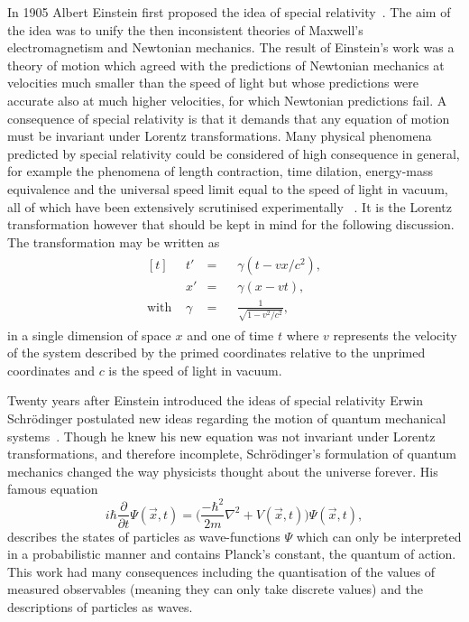 In 1905 Albert Einstein first proposed the idea of special
relativity~\cite{Einstein:special}. The aim of the idea was to unify the then
inconsistent theories of Maxwell's electromagnetism and Newtonian mechanics. The
result of Einstein's work was a theory of motion which agreed with the
predictions of Newtonian mechanics at velocities much smaller than the speed of
light but whose predictions were accurate also at much higher velocities, for
which Newtonian predictions fail. A consequence of special relativity is that
it demands that any equation of motion must be invariant under Lorentz
transformations. Many physical phenomena predicted by special relativity could be
considered of high consequence in general, for example the phenomena of length
contraction, time dilation, energy-mass equivalence and the universal speed
limit equal to the speed of light in vacuum, all of which have been extensively
scrutinised experimentally ~\cite{sr-tests-1, sr-tests-2, sr-tests-3,
sr-tests-4, sr-tests-5, sr-tests-6, sr-tests-7}. It is the Lorentz
transformation however that should be kept in mind for the following discussion.
The transformation may be written as
\begin{equation}
  \begin{split}
    \begin{aligned}[t] &t'&=&\;\;\;\gamma(t -vx/c^{2}),\\
      &x'&=&\;\;\;\gamma(x - vt),\\
      \text{with } &\gamma&=&\;\;\;\frac{1}{\sqrt{1 - v^{2}/c^{2}}},
    \end{aligned}
  \end{split}
  \label{eq:lorentz-transform}
\end{equation} in a single dimension of space $x$ and one of time $t$ where $v$
represents the velocity of the system described by the primed coordinates
relative to the unprimed coordinates and $c$ is the speed of light in vacuum.

Twenty years after Einstein introduced the ideas of special relativity Erwin
Schr\"odinger postulated new ideas regarding the motion of quantum mechanical
systems~\cite{Schrodinger}. Though he knew his new equation was not invariant
under Lorentz transformations, and therefore incomplete, Schr\"odinger's
formulation of quantum mechanics changed the way physicists thought about the
universe forever. His famous equation
\begin{equation}
  \label{eq:schrodinger} i\hbar\frac{\partial}{\partial t}\Psi(\vec{x}, t) =
\Bigg(\frac{-\hbar^{2}}{2m}\nabla^{2} + V(\vec{x}, t) \Bigg)\Psi(\vec{x}, t),
\end{equation} describes the states of particles as wave-functions $\Psi$ which
can only be interpreted in a probabilistic manner and contains Planck's constant,
the quantum of action. This work had many consequences including the
quantisation of the values of measured observables (meaning they can only take
discrete values) and the descriptions of particles as waves.

